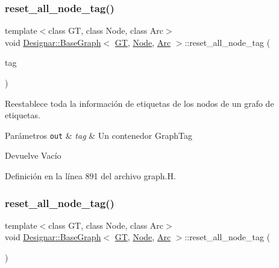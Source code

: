 \subsubsection{\texorpdfstring{reset\+\_\+all\+\_\+node\+\_\+tag()}{reset\_all\_node\_tag()}\hspace{0.1cm}{\footnotesize\ttfamily [1/2]}}
{\footnotesize\ttfamily template$<$class GT, class Node, class Arc$>$ \\
void \hyperlink{class_designar_1_1_base_graph}{Designar\+::\+Base\+Graph}$<$ \hyperlink{demo-buildgraph_8_c_a3001c40d2c31ca87ed96cd7d1334a55e}{GT}, \hyperlink{namespace_designar_a5af326c65aa2bd26b26c410f2030d09e}{Node}, \hyperlink{namespace_designar_a3f55fb5513d62ff47cbc8f72b8e95d6f}{Arc} $>$\+::reset\+\_\+all\+\_\+node\+\_\+tag (\begin{DoxyParamCaption}\item[{\hyperlink{namespace_designar_ac91366256ea6ea6ac5fd483d55a7499e}{Graph\+Tag}}]{tag }\end{DoxyParamCaption})\hspace{0.3cm}{\ttfamily [inline]}}



Reestablece toda la información de etiquetas de los nodos de un grafo de etiquetas. 


\begin{DoxyParams}[1]{Parámetros}
\mbox{\tt out}  & {\em tag} & Un contenedor Graph\+Tag \\
\hline
\end{DoxyParams}
\begin{DoxyReturn}{Devuelve}
Vacío 
\end{DoxyReturn}


Definición en la línea 891 del archivo graph.\+H.

\mbox{\label{class_designar_1_1_base_graph_a7bffa4f055b15f76d12bd7c40730a3dd}} 
\subsubsection{\texorpdfstring{reset\+\_\+all\+\_\+node\+\_\+tag()}{reset\_all\_node\_tag()}\hspace{0.1cm}{\footnotesize\ttfamily [2/2]}}
{\footnotesize\ttfamily template$<$class GT, class Node, class Arc$>$ \\
void \hyperlink{class_designar_1_1_base_graph}{Designar\+::\+Base\+Graph}$<$ \hyperlink{demo-buildgraph_8_c_a3001c40d2c31ca87ed96cd7d1334a55e}{GT}, \hyperlink{namespace_designar_a5af326c65aa2bd26b26c410f2030d09e}{Node}, \hyperlink{namespace_designar_a3f55fb5513d62ff47cbc8f72b8e95d6f}{Arc} $>$\+::reset\+\_\+all\+\_\+node\+\_\+tag (\begin{DoxyParamCaption}{ }\end{DoxyParamCaption})\hspace{0.3cm}{\ttfamily [inline]}}



